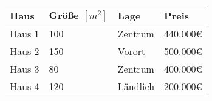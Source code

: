 \begin{tabularx}{\textwidth}{|X|X|X|X|}
    \hline
    \textbf{Haus} & \textbf{Größe $[m^2]$} & \textbf{Lage} & \textbf{Preis} \\
    \hline
    Haus 1        & 100                    & Zentrum       & 440.000€       \\
    \hline
    Haus 2        & 150                    & Vorort        & 500.000€       \\
    \hline
    Haus 3        & 80                     & Zentrum       & 400.000€       \\
    \hline
    Haus 4        & 120                    & Ländlich      & 200.000€       \\
    \hline
\end{tabularx}



